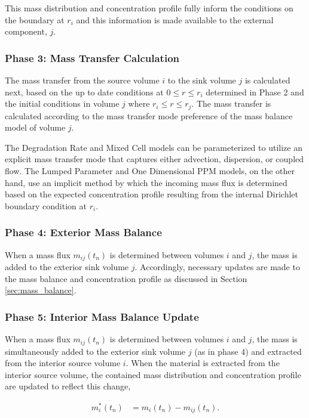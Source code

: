 This mass distribution and concentration profile fully inform 
the conditions on the boundary at $r_i$ and this information is made available 
to the external component, $j$.


\subsubsection{Phase 3: Mass Transfer Calculation}

The mass transfer from the source volume $i$ to the sink volume $j$ is 
calculated next, based on the up to date conditions at $0\le r \le r_{i}$ 
determined in Phase 2 and the initial conditions in volume $j$ where $r_i \le r 
\le r_j$. The mass transfer is calculated according to the mass transfer mode 
preference of the mass balance model of volume $j$.  

The Degradation Rate and Mixed Cell models can be parameterized to utilize an 
explicit mass transfer mode that captures either advection, dispersion, or 
coupled flow.  The Lumped Parameter and One Dimensional PPM models, on the 
other hand, use an implicit method by which the incoming mass flux is determined 
based on the expected concentration profile resulting from the internal 
Dirichlet boundary condition at $r_i$. 

\subsubsection{Phase 4: Exterior Mass Balance}

When a mass flux $m_{ij}(t_n)$ is determined between volumes $i$ and $j$, the 
mass is added to the exterior sink volume $j$. Accordingly, necessary updates 
are made to the mass balance and concentration profile as discussed in Section 
\ref{sec:mass_balance}.

\subsubsection{Phase 5: Interior Mass Balance Update}

When a mass flux $m_{ij}(t_n)$ is determined between volumes $i$ and $j$, the 
mass is simultaneously added to the exterior sink volume $j$ (as in phase 4) and 
extracted from the interior source volume $i$.  When the material is extracted 
from the interior source volume, the contained mass distribution and 
concentration profile are updated to reflect this change,

\begin{align}
  m_{i}^*(t_n) &= m_i(t_n) - m_{ij}(t_n).
\end{align}

